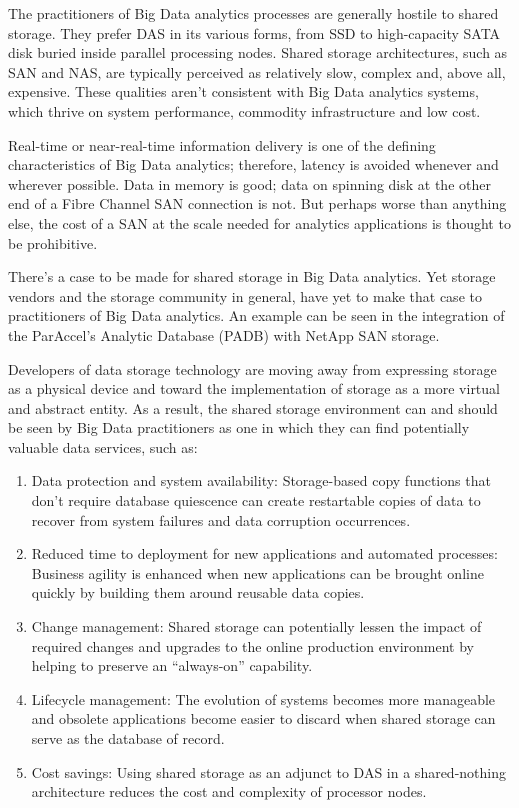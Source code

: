 \documentclass[12pt]{article}
\begin{document}
The practitioners of Big Data analytics processes are generally hostile to shared storage. They prefer DAS in its various forms, from SSD to high-capacity SATA disk buried inside parallel processing nodes. Shared storage architectures, such as SAN and NAS, are typically perceived as relatively slow, complex and, above all, expensive. These qualities aren't consistent with Big Data analytics systems, which thrive on system performance, commodity infrastructure and low cost.


Real-time or near-real-time information delivery is one of the defining characteristics of Big Data analytics; therefore, latency is avoided whenever and wherever possible. Data in memory is good; data on spinning disk at the other end of a Fibre Channel SAN connection is not. But perhaps worse than anything else, the cost of a SAN at the scale needed for analytics applications is thought to be prohibitive.


There's a case to be made for shared storage in Big Data analytics. Yet storage vendors and the storage community in general, have yet to make that case to practitioners of Big Data analytics. An example can be seen in the integration of the ParAccel’s Analytic Database (PADB) with NetApp SAN storage.


Developers of data storage technology are moving away from expressing storage as a physical device and toward the implementation of storage as a more virtual and abstract entity. As a result, the shared storage environment can and should be seen by Big Data practitioners as one in which they can find potentially valuable data services, such as:

\begin{enumerate}
	\item
	Data protection and system availability: Storage-based copy functions that don’t require database quiescence can create restartable copies of data to recover from system failures and data corruption occurrences.
	
	\item
	Reduced time to deployment for new applications and automated processes: Business agility is enhanced when new applications can be brought online quickly by building them around reusable data copies.
	
	\item
	Change management: Shared storage can potentially lessen the impact of required changes and upgrades to the online production environment by helping to preserve an “always-on” capability.
	
	\item
	Lifecycle management: The evolution of systems becomes more manageable and obsolete applications become easier to discard when shared storage can serve as the database of record.
	
	\item
	Cost savings: Using shared storage as an adjunct to DAS in a shared-nothing architecture reduces the cost and complexity of processor nodes.
\end{enumerate}
\end{document}
